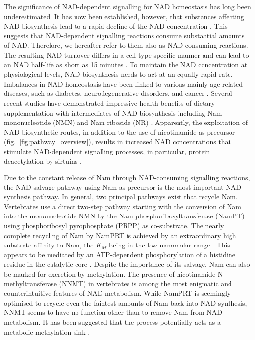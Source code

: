 The significance of NAD-dependent signalling for NAD homeostasis has long been underestimated. It has now been established, however, that substances affecting NAD biosynthesis lead to a rapid decline of the NAD concentration \cite{Buonvicino2018}. This suggests that NAD-dependent signalling reactions consume substantial amounts of NAD. Therefore, we hereafter refer to them also as NAD-consuming reactions. The resulting NAD turnover differs in a cell-type-specific manner and can lead to an NAD half-life as short as 15 minutes \cite{Liu2018}. To maintain the NAD concentration at physiological levels, NAD biosynthesis needs to act at an equally rapid rate. Imbalances in NAD homeostasis have been linked to various mainly age related diseases, such as diabetes, neurodegenerative disorders, and cancer \cite{Chiarugi2012,Verdin2015}. Several recent studies have demonstrated impressive health benefits of dietary supplementation with intermediates of NAD biosynthesis including Nam mononucleotide (NMN) and Nam riboside (NR) \cite{Yoshino2018}. Apparently, the exploitation of NAD biosynthetic routes, in addition to the use of nicotinamide as precursor (fig.~\ref{fig:pathway_overview}), results in increased NAD concentrations that stimulate NAD-dependent signalling processes, in particular, protein deacetylation by sirtuins \cite{North2004}.

Due to the constant release of Nam through NAD-consuming signalling reactions, the NAD salvage pathway using Nam as precursor is the most important NAD synthesis pathway. In general, two principal pathways exist that recycle Nam.  Vertebrates use a direct two-step pathway starting with the conversion of Nam into the mononucleotide NMN by the Nam phosphoribosyltransferase (NamPT) using phosphoribosyl pyrophosphate (PRPP) as co-substrate. The nearly complete recycling of Nam by NamPRT is achieved by an extraordinary high substrate affinity to Nam, the $K_{M}$ being in the low nanomolar range \cite{Burgos2008}. This appears to be mediated by an ATP-dependent phosphorylation of a histidine residue in the catalytic core \cite{Burgos2009}. Despite the importance of its salvage, Nam can also be marked for excretion by methylation. The presence of nicotinamide N-methyltransferase (NNMT) in vertebrates \cite{Gossmann2012FEBS} is among the most enigmatic and counterintuitive features of NAD metabolism. While NamPRT is seemingly optimised to recycle even the faintest amounts of Nam back into NAD synthesis, NNMT seems to have no function other than to remove Nam from NAD metabolism. It has been suggested that the process potentially acts as a metabolic methylation sink \cite{Pissios2017}.

